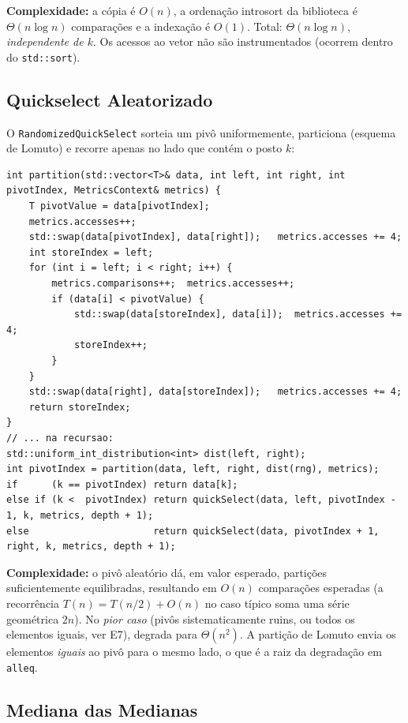 \documentclass{infufrgs}
\begin{document}
\textbf{Complexidade:} a cópia é $O(n)$, a ordenação introsort da biblioteca é $\Theta(n \log n)$ comparações e a indexação é $O(1)$. Total: $\Theta(n \log n)$, \emph{independente de $k$}. Os acessos ao vetor não são instrumentados (ocorrem dentro do \texttt{std::sort}).

\subsection{Quickselect Aleatorizado}

O \texttt{RandomizedQuickSelect} sorteia um pivô uniformemente, particiona (esquema de Lomuto) e recorre apenas no lado que contém o posto $k$:

\begin{lstlisting}[caption={Partição de Lomuto e recursão (RandomizedQuickSelect.h)}]
int partition(std::vector<T>& data, int left, int right, int pivotIndex, MetricsContext& metrics) {
    T pivotValue = data[pivotIndex];
    metrics.accesses++;
    std::swap(data[pivotIndex], data[right]);   metrics.accesses += 4;
    int storeIndex = left;
    for (int i = left; i < right; i++) {
        metrics.comparisons++;  metrics.accesses++;
        if (data[i] < pivotValue) {
            std::swap(data[storeIndex], data[i]);  metrics.accesses += 4;
            storeIndex++;
        }
    }
    std::swap(data[right], data[storeIndex]);   metrics.accesses += 4;
    return storeIndex;
}
// ... na recursao:
std::uniform_int_distribution<int> dist(left, right);
int pivotIndex = partition(data, left, right, dist(rng), metrics);
if      (k == pivotIndex) return data[k];
else if (k <  pivotIndex) return quickSelect(data, left, pivotIndex - 1, k, metrics, depth + 1);
else                      return quickSelect(data, pivotIndex + 1, right, k, metrics, depth + 1);
\end{lstlisting}

\textbf{Complexidade:} o pivô aleatório dá, em valor esperado, partições suficientemente equilibradas, resultando em $O(n)$ comparações esperadas (a recorrência $T(n) = T(n/2) + O(n)$ no caso típico soma uma série geométrica $2n$). No \emph{pior caso} (pivôs sistematicamente ruins, ou todos os elementos iguais, ver E7), degrada para $\Theta(n^2)$. A partição de Lomuto envia os elementos \emph{iguais} ao pivô para o mesmo lado, o que é a raiz da degradação em \texttt{alleq}.

\subsection{Mediana das Medianas}
\end{document}
